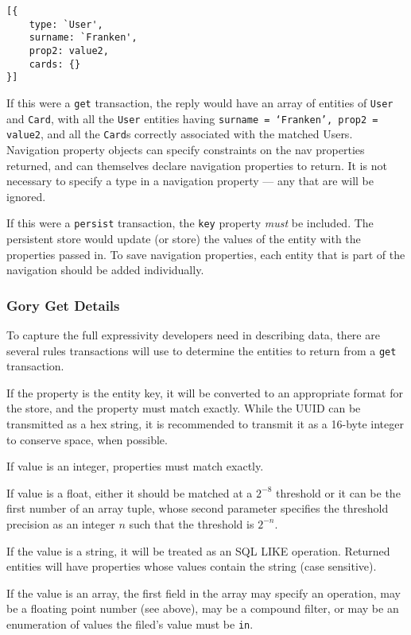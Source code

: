 \documentclass{article}
\newcommand{\ilcode}{\tt}
\begin{document}
\linespread{1}
\begin{lstlisting}
[{
	type: `User',
	surname: `Franken',
	prop2: value2,
	cards: {}
}]
\end{lstlisting}
\linespread{1.6}

If this were a {\ilcode get} transaction, the reply would have an array of
entities of {\ilcode User} and {\ilcode Card}, with all the {\ilcode User}
entities having {\ilcode surname = `Franken', prop2 = value2}, and all the
{\ilcode Card}s correctly associated with the matched Users.  Navigation
property objects can specify constraints on the nav properties returned, and can
themselves declare navigation properties to return. It is not necessary to
specify a type in a navigation property --- any that are will be ignored.

If this were a {\ilcode persist} transaction, the {\ilcode key} property {\it
must} be included. The persistent store would update (or store) the values of
the entity with the properties passed in. To save navigation properties, each
entity that is part of the navigation should be added individually.

\subsubsection{Gory Get Details}

To capture the full expressivity developers need in describing data, there are
several rules transactions will use to determine the entities to return from a
{\ilcode get} transaction.

If the property is the entity key, it will be converted to an appropriate format
for the store, and the property must match exactly. While the UUID can be
transmitted as a hex string, it is recommended to transmit it as a 16-byte
integer to conserve space, when possible.

If value is an integer, properties must match exactly.

If value is a float, either it should be matched at a $2^{-8}$ threshold or it
can be the first number of an array tuple, whose second parameter specifies the
threshold precision as an integer $n$ such that the threshold is $2^{-n}$.

If the value is a string, it will be treated as an SQL LIKE operation. Returned
entities will have properties whose values contain the string (case sensitive).

If the value is an array, the first field in the array may specify an operation,
may be a floating point number (see above), may be a compound filter, or may be
an enumeration of values the filed's value must be {\ilcode in}.
\end{document}
